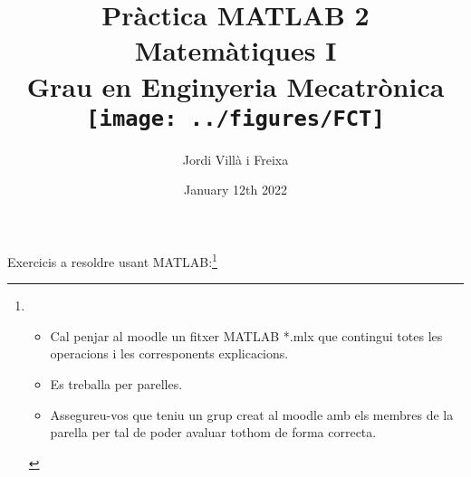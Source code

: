 \documentclass[]{book}
\title{Pràctica MATLAB 2 \\ Matemàtiques I \\ Grau en Enginyeria Mecatrònica \\\vspace{2cm} \texttt{[image: ../figures/FCT]}}
\author{Jordi Villà i Freixa}
\date{January 12th 2022}
\begin{document}
\maketitle

Exercicis a resoldre usant MATLAB:\footnote{\begin{itemize}
  \item Cal penjar al moodle un fitxer MATLAB *.mlx que contingui totes les operacions i les corresponents explicacions.
  \item Es treballa per parelles.
  \item Assegureu-vos que teniu un grup creat al moodle amb els membres de la parella per tal de poder avaluar tothom de forma correcta.
\end{itemize}}
\end{document}
